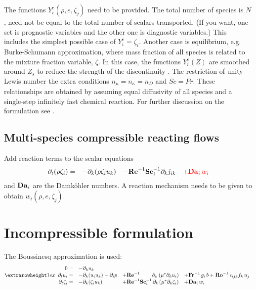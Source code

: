 The functions $Y_i^e(\rho,e,\zeta_j)$ need to be provided. The total number of species is $N$, need not be equal to the total number of scalars transported. (If you want, one set is prognostic variables and the other one is diagnostic variables.) This includes the simplest possible case of $Y_i^e = \zeta_i$. Another case is equilibrium, e.g. Burke-Schumann approximation, where mass fraction of all species is related to the mixture fraction variable, $\zeta$.  In this case, the functions $Y_i^e(Z)$ are smoothed around $Z_s$ to reduce the strength of the discontinuity \citep{Higuera:1994}. The restriction of unity Lewis number the extra conditions $n_\mu=n_\kappa=n_D$ and $Sc=Pr$. These relationships are obtained by assuming equal diffusivity of all species and a single-step infinitely fast chemical reaction.  For further discussion on the formulation see \cite{Williams:1985}.

\subsection{Multi-species compressible reacting flows}

Add reaction terms to the scalar equations
\begin{equation}
\begin{array}{rlll}
  \partial_t (\rho \zeta_i)=&
  - \partial_k (\rho \zeta_i u_k) &
  - \mathrm{\bf Re}^{-1}\mathrm{\bf Sc}_i^{-1} \partial_k j_{ik} & \color{red}{+ \mathrm{\bf Da}_i\,w_i}
\end{array}
\end{equation}
and $\mathrm{\bf Da}_i$ are the Damk{\"o}hler numbers. A reaction mechanism needs to be given to obtain $w_i(\rho,e,\zeta_j)$.

\section{Incompressible formulation}

The Boussinesq approximation is used:
\begin{equation}
\setlength{\extrarowheight}{1ex}
\begin{array}{rlll}
  0 =&
  -\partial_k u_k   & \\
  \partial_t  u_i =& 
  -\partial_k ( u_i u_k )-\partial_i p &
  +\mathrm{\bf Re}^{-1}\qquad\;\partial_k \left( \mu^{*} \partial_k u_i\right) &
  +\mathrm{\bf Fr}^{-1}\, g_i\,b+\mathrm{\bf Ro}^{-1}\,\epsilon_{ijk} f_k\,u_j  \\
  \partial_t \zeta_i =&
  -\partial_k (\zeta_i u_k) &
  + \mathrm{\bf Re}^{-1}\mathrm{\bf Sc}_i^{-1}\, \partial_k \left( \mu^{*}\partial_k\zeta_i\right) &+ \mathrm{\bf Da}_i\,w_i
\end{array}
\end{equation}

